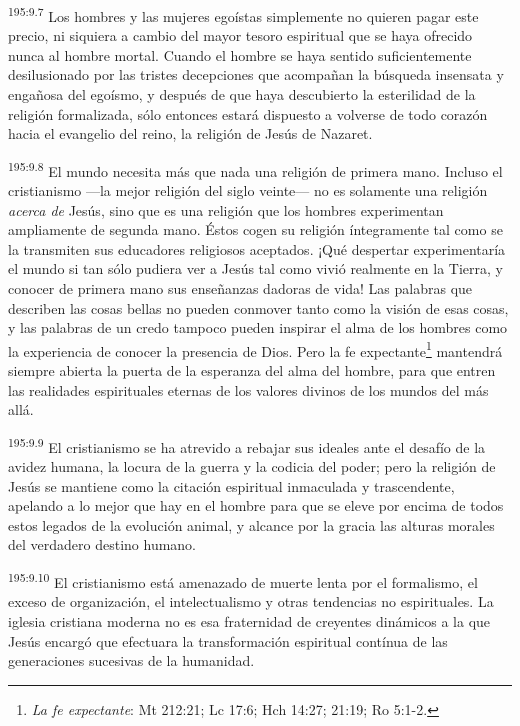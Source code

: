 \par
\textsuperscript{195:9.7} Los hombres y las mujeres egoístas simplemente no quieren pagar este precio, ni siquiera a cambio del mayor tesoro espiritual que se haya ofrecido nunca al hombre mortal. Cuando el hombre se haya sentido suficientemente desilusionado por las tristes decepciones que acompañan la búsqueda insensata y engañosa del egoísmo, y después de que haya descubierto la esterilidad de la religión formalizada, sólo entonces estará dispuesto a volverse de todo corazón hacia el evangelio del reino, la religión de Jesús de Nazaret.

\par
\textsuperscript{195:9.8} El mundo necesita más que nada una religión de primera mano. Incluso el cristianismo ---la mejor religión del siglo veinte--- no es solamente una religión \textit{acerca de} Jesús, sino que es una religión que los hombres experimentan ampliamente de segunda mano. Éstos cogen su religión íntegramente tal como se la transmiten sus educadores religiosos aceptados. ¡Qué despertar experimentaría el mundo si tan sólo pudiera ver a Jesús tal como vivió realmente en la Tierra, y conocer de primera mano sus enseñanzas dadoras de vida! Las palabras que describen las cosas bellas no pueden conmover tanto como la visión de esas cosas, y las palabras de un credo tampoco pueden inspirar el alma de los hombres como la experiencia de conocer la presencia de Dios. Pero la fe expectante\footnote{\textit{La fe expectante}: Mt 212:21; Lc 17:6; Hch 14:27; 21:19; Ro 5:1-2.} mantendrá siempre abierta la puerta de la esperanza del alma del hombre, para que entren las realidades espirituales eternas de los valores divinos de los mundos del más allá.

\par
\textsuperscript{195:9.9} El cristianismo se ha atrevido a rebajar sus ideales ante el desafío de la avidez humana, la locura de la guerra y la codicia del poder; pero la religión de Jesús se mantiene como la citación espiritual inmaculada y trascendente, apelando a lo mejor que hay en el hombre para que se eleve por encima de todos estos legados de la evolución animal, y alcance por la gracia las alturas morales del verdadero destino humano.

\par
\textsuperscript{195:9.10} El cristianismo está amenazado de muerte lenta por el formalismo, el exceso de organización, el intelectualismo y otras tendencias no espirituales. La iglesia cristiana moderna no es esa fraternidad de creyentes dinámicos a la que Jesús encargó que efectuara la transformación espiritual contínua de las generaciones sucesivas de la humanidad.

